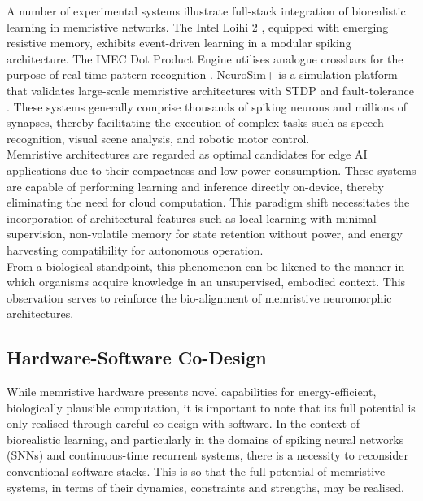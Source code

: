\noindent A number of experimental systems illustrate full-stack integration of biorealistic learning in memristive networks. The Intel Loihi 2 \cite{orchard2021efficient}, equipped with emerging resistive memory, exhibits event-driven learning in a modular spiking architecture. The IMEC Dot Product Engine utilises analogue crossbars for the purpose of real-time pattern recognition \cite{zha2017imec}. NeuroSim+ is a simulation platform that validates large-scale memristive architectures with STDP and fault-tolerance \cite{chen2017neurosim+}. These systems generally comprise thousands of spiking neurons and millions of synapses, thereby facilitating the execution of complex tasks such as speech recognition, visual scene analysis, and robotic motor control. \\

\noindent Memristive architectures are regarded as optimal candidates for edge AI applications due to their compactness and low power consumption. These systems are capable of performing learning and inference directly on-device, thereby eliminating the need for cloud computation. This paradigm shift necessitates the incorporation of architectural features such as local learning with minimal supervision, non-volatile memory for state retention without power, and energy harvesting compatibility for autonomous operation. \\

\noindent From a biological standpoint, this phenomenon can be likened to the manner in which organisms acquire knowledge in an unsupervised, embodied context. This observation serves to reinforce the bio-alignment of memristive neuromorphic architectures.

\subsection[Hardware-Software Co-Design]{Hardware-Software Co-Design}

While memristive hardware presents novel capabilities for energy-efficient, biologically plausible computation, it is important to note that its full potential is only realised through careful co-design with software. In the context of biorealistic learning, and particularly in the domains of spiking neural networks (SNNs) and continuous-time recurrent systems, there is a necessity to reconsider conventional software stacks. This is so that the full potential of memristive systems, in terms of their dynamics, constraints and strengths, may be realised.\\

